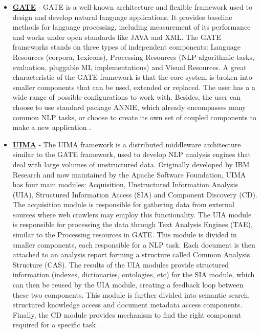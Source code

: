 \begin{itemize}
    \item \textbf{\href{https://gate.ac.uk}{GATE}} - GATE is a well-known architecture and flexible framework used to design and develop natural language applications. It provides baseline methods for language processing, including measurement of its performance and works under open standards like JAVA and XML. The GATE frameworks stands on three types of independent components: Language Resources (corpora, 1exicons), Processing Resources (NLP algorithmic tasks, evaluation, pluggable ML implementations) and Visual Resources. A great characteristic of the GATE framework is that the core system is broken into smaller components that can be used, extended or replaced. The user has a a wide range of possible configurations to work with. Besides, the user can choose to use standard package ANNIE, which already encompasses many common NLP tasks, or choose to create its own set of coupled components to make a new application \citep{Cunningham2002GATE}.
    \item \textbf{\href{http://uima.apache.org}{UIMA}} - The UIMA framework is a distributed middleware architecture similar to the GATE framework, used to develop NLP analysis engines that deal with large volumes of unstructured data. Originally developed by IBM Research and now maintained by the Apache Software Foundation, UIMA has four main modules: Acquisition, Unstructured Information Analysis (UIA), Structured Information Access (SIA) and Component Discovery (CD). \\ The acquisition module is responsible for gathering data from external sources where web crawlers may employ this functionality. The UIA module is responsible for processing the data through Text Analysis Engines (TAE), similar to the Processing resources in GATE. This module is divided in smaller components, each responsible for a NLP task. Each document is then attached to an analysis report forming a structure called Common Analysis Structure (CAS). The results of the UIA modules provide structured information (indexes, dictionaries, ontologies, etc) for the SIA module, which can then be reused by the UIA module, creating a feedback loop between these two components. This module is further divided into semantic search, structured knowledge access and document metadata access components. Finally, the CD module provides mechanism to find the right component required for a specific task \citep{Ferrucci2004UIMA}.

\end{itemize}
